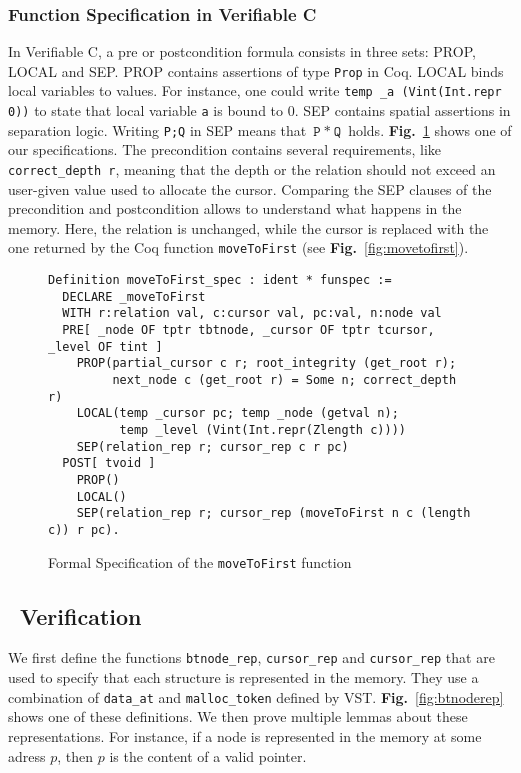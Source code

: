 \subsubsection{Function Specification in Verifiable C}
In Verifiable C, a pre or postcondition formula consists in three sets: PROP, LOCAL and SEP.
PROP contains assertions of type \texttt{Prop} in Coq.
LOCAL binds local variables to values. For instance, one could write \texttt{temp \_a (Vint(Int.repr 0))} to state that local variable \texttt{a} is bound to 0.
SEP contains spatial assertions in separation logic. Writing \texttt{P;Q} in SEP means that $\texttt{P}~*~\texttt{Q}$ holds.
\textbf{Fig.}~\ref{fig:spec} shows one of our specifications.
The precondition contains several requirements, like \texttt{correct\_depth r}, meaning that the depth or the relation should not exceed an user-given value used to allocate the cursor.
Comparing the SEP clauses of the precondition and postcondition allows to understand what happens in the memory.
Here, the relation is unchanged, while the cursor is replaced with the one returned by the Coq function \texttt{moveToFirst} (see \textbf{Fig.}~\ref{fig:movetofirst}).

\begin{figure}
\begin{lstlisting}
Definition moveToFirst_spec : ident * funspec :=
  DECLARE _moveToFirst
  WITH r:relation val, c:cursor val, pc:val, n:node val
  PRE[ _node OF tptr tbtnode, _cursor OF tptr tcursor, _level OF tint ]
    PROP(partial_cursor c r; root_integrity (get_root r);
         next_node c (get_root r) = Some n; correct_depth r)
    LOCAL(temp _cursor pc; temp _node (getval n);
          temp _level (Vint(Int.repr(Zlength c))))
    SEP(relation_rep r; cursor_rep c r pc)
  POST[ tvoid ]
    PROP()
    LOCAL()
    SEP(relation_rep r; cursor_rep (moveToFirst n c (length c)) r pc).
\end{lstlisting}
\label{fig:spec}
\caption{Formal Specification of the \texttt{moveToFirst} function}
\end{figure}



\subsection{\btrees\ Verification}
We first define the functions \texttt{btnode\_rep}, \texttt{cursor\_rep} and \texttt{cursor\_rep} that are used to specify that each structure is represented in the memory.
They use a combination of \texttt{data\_at} and \texttt{malloc\_token} defined by VST.
\textbf{Fig.}~\ref{fig:btnoderep} shows one of these definitions.
We then prove multiple lemmas about these representations. For instance, if a node is represented in the memory at some adress $p$, then $p$ is the content of a valid pointer.

